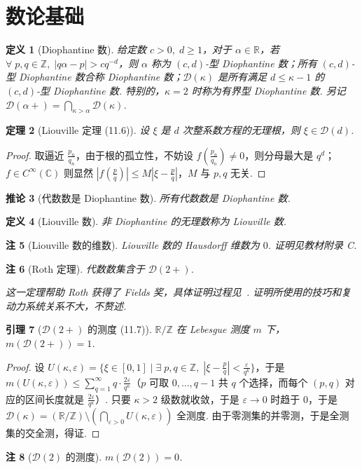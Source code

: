 \documentclass[11pt, a4paper, oneside]{ctexart}
\newtheorem{theorem}{定理}[section]
\newtheorem{corollary}[theorem]{推论}
\newtheorem{definition}[theorem]{定义}
\newtheorem{lemma}[theorem]{引理}
\newtheorem{remark}[theorem]{注}
\newcommand{\C}{\mathbb{C}}
\newcommand{\R}{\mathbb{R}}
\newcommand{\Z}{\mathbb{Z}}
\newcommand{\cD}{\mathcal{D}}
\begin{document}
    \section{数论基础}
    \begin{definition}[Diophantine 数]
        给定数 $c>0,\;d\geq 1$，对于 $\alpha\in \R$，若 $\forall\; p,q\in\Z,\; |q\alpha-p|>cq^{-d}$，则 $\alpha$ 称为 $(c,d)$-型 Diophantine 数；所有 $(c,d)$-型 Diophantine 数合称 Diophantine 数；$\cD(\kappa)$ 是所有满足 $d\leq \kappa-1$ 的 $(c,d)$-型 Diophantine 数. 特别的，$\kappa=2$ 时称为有界型 Diophantine 数. 另记 $\cD(\alpha+)=\bigcap\limits_{\kappa>\alpha}\cD(\kappa)$.
    \end{definition}

    \begin{theorem}[Liouville 定理 (11.6)]
        设 $\xi$ 是 $d$ 次整系数方程的无理根，则 $\xi\in \cD(d)$.
    \end{theorem}
    \begin{proof}
        取逼近 $\frac{p_n}{q_n}$，由于根的孤立性，不妨设 $f(\frac{p_n}{q_n})\neq 0$，则分母最大是 $q^d$；$f\in C^{\infty}(\C)$ 则显然 $|f(\frac{p}{q})|\leq M|\xi-\frac{p}{q}|$，$M$ 与 $p,q$ 无关.
    \end{proof}
    \begin{corollary}[代数数是 Diophantine 数]
        所有代数数是 Diophantine 数.
    \end{corollary}
    \begin{definition}[Liouville 数]
        非 Diophantine 的无理数称为 Liouville 数.
    \end{definition}
    \begin{remark}[Liouville 数的维数]
        Liouville 数的 Hausdorff 维数为 $0$. 证明见教材附录 C.
    \end{remark}
    \begin{remark}[Roth 定理]
        代数数集含于 $\cD(2+)$.

        这一定理帮助 Roth 获得了 Fields 奖，具体证明过程见~\cite{roth}. 证明所使用的技巧和复动力系统关系不大，不赘述.
    \end{remark}

    \begin{lemma}[$\cD(2+)$ 的测度 (11.7)]\label{引理11.7}
        $\R/\Z$ 在 Lebesgue 测度 $m$ 下，$m(\cD(2+))=1$.
    \end{lemma}
    \begin{proof}
        设 $U(\kappa,\varepsilon)=\{\xi\in [0,1]\mid \exists\; p,q\in\Z,\; |\xi-\frac{p}{q}|<\frac{\varepsilon}{q^k}\}$，于是 $m(U(\kappa,\varepsilon))\leq \sum\limits_{q=1}^{\infty}q\cdot\frac{2\varepsilon}{q^{\kappa}}$（$p$ 可取 $0,\ldots,q-1$ 共 $q$ 个选择，而每个 $(p,q)$ 对应的区间长度就是 $\frac{2\varepsilon}{q^{\kappa}}$）. 只要 $\kappa>2$ 级数就收敛，于是 $\varepsilon\to 0$ 时趋于 $0$，于是 $\cD(\kappa)=(\R/\Z)\setminus(\bigcap\limits_{\varepsilon>0}U(\kappa,\varepsilon))$ 全测度. 由于零测集的并零测，于是全测集的交全测，得证.
    \end{proof}
    \begin{remark}[$\cD(2)$ 的测度]
        $m(\cD(2))=0$.
    \end{remark}
\end{document}
